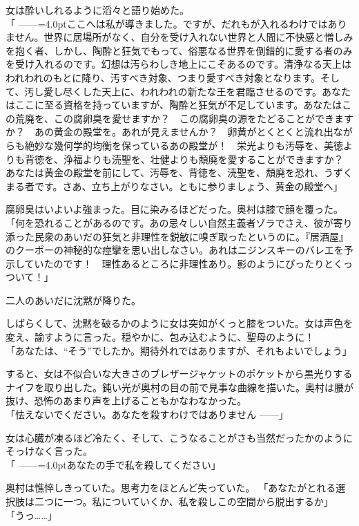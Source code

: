 \documentclass[b5j,twoside,twocolumn]{utarticle}
\begin{document}
女は酔いしれるように滔々と語り始めた。\\
「\tbaselineshift =2.5pt ------\tbaselineshift =4.0ptここへは私が導きました。ですが、だれもが入れるわけではありません。世界に居場所がなく、自分を受け入れない世界と人間に不快感と憎しみを抱く者、しかし、陶酔と狂気でもって、俗悪なる世界を倒錯的に愛する者のみを受け入れるのです。幻想は汚らわしき地上にこそあるのです。清浄なる天上はわれわれのもとに降り、汚すべき対象、つまり愛すべき対象となります。そして、汚し愛し尽くした天上に、われわれの新たな王を君臨させるのです。あなたはここに至る資格を持っていますが、陶酔と狂気が不足しています。あなたはこの荒廃を、この腐卵臭を愛せますか？　この腐卵臭の源をたどることができますか？　あの黄金の殿堂を。あれが見えませんか？　卵黄がとくとくと流れ出ながらも絶妙な幾何学的均衡を保っているあの殿堂が！　栄光よりも汚辱を、美徳よりも背徳を、浄福よりも涜聖を、壮健よりも頽廃を愛することができますか？　あなたは黄金の殿堂を前にして、汚辱を、背徳を、涜聖を、頽廃を恐れ、うずくまる者です。さあ、立ち上がりなさい。ともに参りましょう、黄金の殿堂へ」


腐卵臭はいよいよ強まった。目に染みるほどだった。奥村は膝で顔を覆った。\\
「何を恐れることがあるのです。あの忌々しい自然主義者ゾラでさえ、彼が寄り添った民衆のあいだの狂気と非理性を鋭敏に嗅ぎ取ったというのに。『居酒屋』のクーポーの神秘的な痙攣を思い出しなさい。あれはニジンスキーのバレエを予示していたのです！　理性あるところに非理性あり。影のようにぴったりとくっついて！」


二人のあいだに沈黙が降りた。


しばらくして、沈黙を破るかのように女は突如がくっと膝をついた。女は声色を変え、諭すように言った。穏やかに、包み込むように、聖母のように！\\
「あなたは、“そう”でしたか。期待外れではありますが、それもよいでしょう」


すると、女は不似合いな大きさのブレザージャケットのポケットから黒光りするナイフを取り出した。鈍い光が奥村の目の前で見事な曲線を描いた。奥村は腰が抜け、恐怖のあまり声を上げることもかなわなかった。\\
「怯えないでください。あなたを殺すわけではありません\tbaselineshift =2.5pt ------\tbaselineshift =4.0pt」


女は心臓が凍るほど冷たく、そして、こうなることがさも当然だったかのようにそっけなく言った。\\
「\tbaselineshift =2.5pt ------\tbaselineshift =4.0ptあなたの手で私を殺してください」


奥村は憔悴しきっていた。思考力をほとんど失っていた。
「あなたがとれる選択肢は二つに一つ。私についていくか、私を殺しこの空間から脱出するか」\\
「うっ……」
\end{document}
